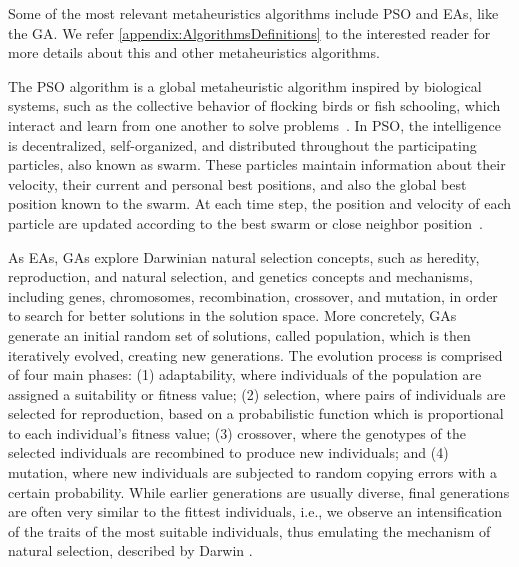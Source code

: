 	Some of the most relevant metaheuristics algorithms include \ac{PSO} and \acp{EA}, like the \ac{GA}. We refer \cref{appendix:AlgorithmsDefinitions} to the interested reader for more details about this and other metaheuristics algorithms.
	
	The \ac{PSO} algorithm is a global metaheuristic algorithm inspired by biological systems, such as the collective behavior of flocking birds or fish schooling, which interact and learn from one another to solve problems~\cite{Brownlee2011}. In \ac{PSO}, the intelligence is decentralized, self-organized, and distributed throughout the participating particles, also known as swarm. These particles maintain information about their velocity, their current and personal best positions, and also the global best position known to the swarm. At each time step, the position and velocity of each particle are updated according to the best swarm or close neighbor position~\cite{Brownlee2011}.
	
	As \acp{EA}, \acp{GA} explore Darwinian natural selection concepts, such as heredity, reproduction, and natural selection, and genetics concepts and mechanisms, including genes, chromosomes, recombination, crossover, and mutation, in order to search for better solutions in the solution space. More concretely, \acp{GA} generate an initial random set of solutions, called population, which is then iteratively evolved, creating new generations. The evolution process is comprised of four main phases: (1) adaptability, where individuals of the population are assigned a suitability or fitness value; (2) selection, where pairs of individuals are selected for reproduction, based on a probabilistic function which is proportional to each individual's fitness value; (3) crossover, where the genotypes of the selected individuals are recombined to produce new individuals; and (4) mutation, where new individuals are subjected to random copying errors with a certain probability. While earlier generations are usually diverse, final generations are often very similar to the fittest individuals, i.e., we observe an intensification of the traits of the most suitable individuals, thus emulating the mechanism of natural selection, described by Darwin \cite{Brownlee2011}. %
	
